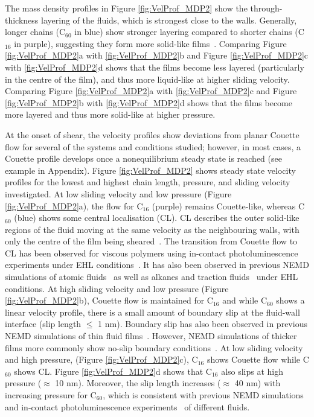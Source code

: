 \documentclass[5p]{elsarticle}
\begin{document}
The mass density profiles in Figure \ref{fig:VelProf_MDP2} show the through-thickness layering of the fluids, which is strongest close to the walls. Generally, longer chains (C$_{60}$ in blue) show stronger layering compared to shorter chains (C$_{16}$ in purple), suggesting they form more solid-like films~\cite{Ewen2017a}. Comparing Figure \ref{fig:VelProf_MDP2}a with \ref{fig:VelProf_MDP2}b and Figure \ref{fig:VelProf_MDP2}c with \ref{fig:VelProf_MDP2}d shows that the films become less layered (particularly in the centre of the film), and thus more liquid-like at higher sliding velocity. Comparing Figure \ref{fig:VelProf_MDP2}a with \ref{fig:VelProf_MDP2}c and Figure \ref{fig:VelProf_MDP2}b with \ref{fig:VelProf_MDP2}d shows that the films become more layered and thus more solid-like at higher pressure.

At the onset of shear, the velocity profiles show deviations from planar Couette flow for several of the systems and conditions studied; however, in most cases, a Couette profile develops once a nonequilibrium steady state is reached (see example in Appendix). Figure \ref{fig:VelProf_MDP2} shows steady state velocity profiles for the lowest and highest chain length, pressure, and sliding velocity investigated. At low sliding velocity and low pressure (Figure \ref{fig:VelProf_MDP2}a), the flow for C$_{16}$ (purple) remains Couette-like, whereas C$_{60}$ (blue) shows some central localisation (CL). CL describes the outer solid-like regions of the fluid moving at the same velocity as the neighbouring walls, with only the centre of the film being sheared~\cite{Heyes2012}. The transition from Couette flow to CL has been observed for viscous polymers using in-contact photoluminescence experiments under EHL conditions~\cite{Galmiche2016}. It has also been observed in previous NEMD simulations of atomic fluids~\cite{Heyes2012,Gattinoni2013,Mackowiak2016} as well as alkanes and traction fluids~\cite{Ewen2017a} under EHL conditions. At high sliding velocity and low pressure (Figure \ref{fig:VelProf_MDP2}b), Couette flow is maintained for C$_{16}$ and while C$_{60}$ shows a linear velocity profile, there is a small amount of boundary slip at the fluid-wall interface (slip length $\leq$ 1 nm). Boundary slip has also been observed in previous NEMD simulations of thin fluid films~\cite{Jabbarzadeh1999,Sivebaek2010,Ta2017,Porras-Vazquez2018}. However, NEMD simulations of thicker films more commonly show no-slip boundary conditions~\cite{Washizu2010,Washizu2014}. At low sliding velocity and high pressure, (Figure \ref{fig:VelProf_MDP2}c), C$_{16}$ shows Couette flow while C$_{60}$ shows CL. Figure \ref{fig:VelProf_MDP2}d shows that C$_{16}$ also slips at high pressure ($\approx$ 10 nm). Moreover, the slip length increases ($\approx$ 40 nm) with increasing pressure for C$_{60}$, which is consistent with previous NEMD simulations~\cite{Ta2017} and in-contact photoluminescence experiments~\cite{Ponjavic2014} of different fluids.
\end{document}
